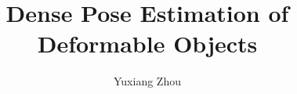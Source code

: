 \documentclass[a4paper,12pt,twoside]{report}
\begin{document}
\title{\LARGE {\bf Dense Pose Estimation of Deformable Objects}\\
 \vspace*{6mm}
}

\author{Yuxiang Zhou}

\normallinespacing
\maketitle

\preface





\body









\appendix




\end{document}
